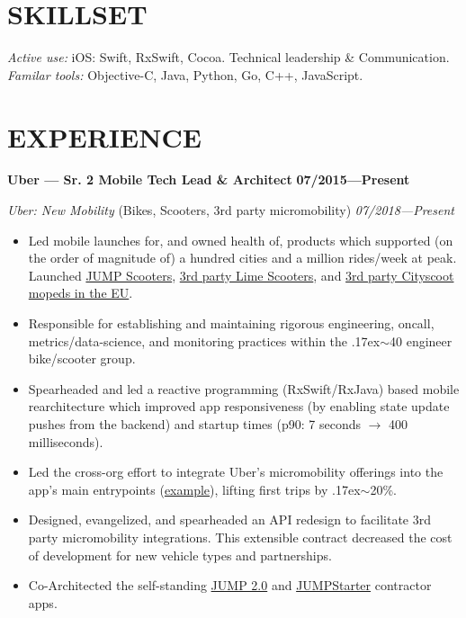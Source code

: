 \documentclass[line,margin]{res}
\newcommand{\goodtilde}{\raise.17ex\hbox{$\scriptstyle\mathtt{\sim}$}}
\begin{document}
\address{adam@zethrae.us}
\address{+1 (401) 339-8675}

 
\begin{resume}

\section{SKILLSET}
    {\sl Active use:} iOS: Swift, RxSwift, Cocoa. Technical leadership \& Communication. \\
    {\sl Familar tools:} Objective-C, Java, Python, Go, C++, JavaScript.

\section{EXPERIENCE}
    \textbf{Uber — Sr. 2 Mobile Tech Lead \& Architect} \hfill \textbf{07/2015—Present}

    {\sl Uber: New Mobility} (Bikes, Scooters, 3rd party micromobility) \hfill {\sl07/2018—Present}
    \begin{itemize}  \itemsep -1pt
        \item Led mobile launches for, and owned health of, products which supported (on the order of magnitude of) a hundred cities and a million rides/week at peak. Launched \href{https://www.uber.com/newsroom/jump-scooters/}{JUMP Scooters}, \href{https://www.theverge.com/2018/7/9/17548848/uber-investment-lime-scooter-alphabet}{3rd party Lime Scooters}, and \href{https://www.uber.com/newsroom/cityscoot-emopeds/}{3rd party Cityscoot mopeds in the EU}.
        \item Responsible for establishing and maintaining rigorous engineering, oncall, metrics/data-science, and monitoring practices within the \goodtilde40 engineer bike/scooter group.
        \item Spearheaded and led a reactive programming (RxSwift/RxJava) based mobile rearchitecture which improved app responsiveness (by enabling state update pushes from the backend) and startup times (p90: 7 seconds $\rightarrow$ 400 milliseconds).
        \item Led the cross-org effort to integrate Uber's micromobility offerings into the app's main entrypoints (\href{https://techcrunch.com/2019/07/01/uber-brings-bikes-and-scooters-including-limes-to-the-forefront/}{example}), lifting first trips by \goodtilde20\%.
        \item Designed, evangelized, and spearheaded an API redesign to facilitate 3rd party micromobility integrations. This extensible contract decreased the cost of development for new vehicle types and partnerships.
        \item Co-Architected the self-standing \href{https://apps.apple.com/us/app/jump-by-uber/id1251322970}{JUMP 2.0} and \href{https://www.jump.com/us/en/jumpstarter/how-it-works/}{JUMPStarter} contractor apps.
    \end{itemize}


\end{resume}
\end{document}
